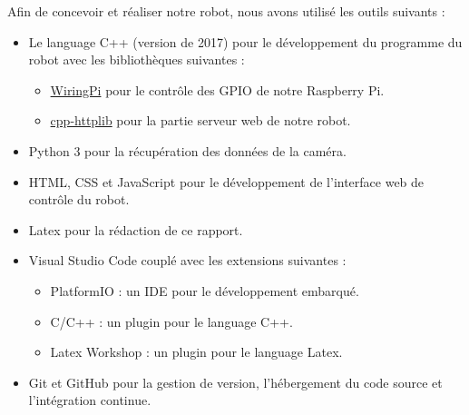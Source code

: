 Afin de concevoir et réaliser notre robot, nous avons utilisé les outils suivants :
\begin{itemize}
    \item Le language C++ (version de 2017) pour le développement du programme du robot avec les bibliothèques suivantes :
    \begin{itemize}
        \item \hyperlink{https://github.com/WiringPi/WiringPi}{WiringPi} pour le contrôle des GPIO de notre Raspberry Pi.
        \item \hyperlink{https://github.com/yhirose/cpp-httplib}{cpp-httplib} pour la partie serveur web de notre robot.
    \end{itemize}
    \item Python 3 pour la récupération des données de la caméra.
    \item HTML, CSS et JavaScript pour le développement de l'interface web de contrôle du robot.
    \item Latex pour la rédaction de ce rapport.
    \item Visual Studio Code couplé avec les extensions suivantes :
    \begin{itemize}
        \item PlatformIO : un IDE pour le développement embarqué.
        \item C/C++ : un plugin pour le language C++.
        \item Latex Workshop : un plugin pour le language Latex.
    \end{itemize}
    \item Git et GitHub pour la gestion de version, l'hébergement du code source et l'intégration continue.
\end{itemize}
